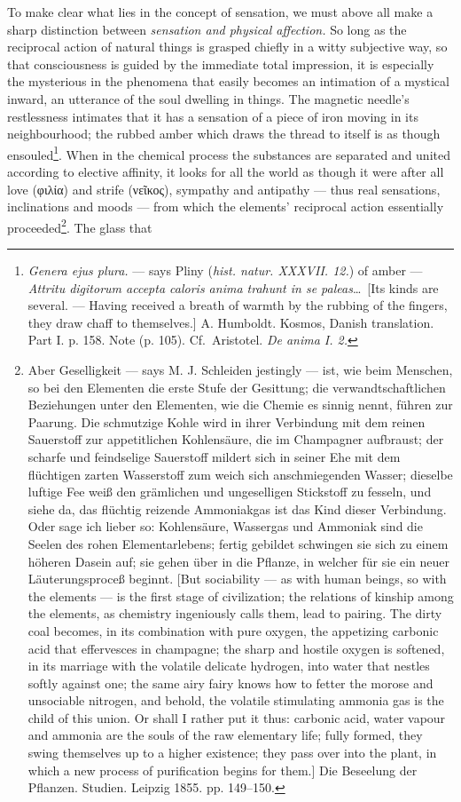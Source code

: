 \documentclass[12pt,a4paper]{book}
\begin{document}
To make clear what lies in the concept of sensation, we must above all make a sharp
distinction between \emph{sensation and physical affection.} So long as the
reciprocal action of natural things is grasped chiefly in a witty subjective way,
so that consciousness is guided by the immediate total impression, it is especially
the mysterious in the phenomena that easily becomes an intimation of a mystical
inward, an utterance of the soul dwelling in things. The magnetic needle's
restlessness intimates that it has a sensation of a piece of iron moving in its
neighbourhood; the rubbed amber which draws the thread to itself is as though
ensouled\footnote{\textit{Genera ejus plura.} --- says Pliny
(\textit{hist. natur. XXXVII. 12.}) of amber --- \textit{Attritu digitorum accepta
caloris anima trahunt in se paleas}\ldots\ [Its kinds are several. --- Having
received a breath of warmth by the rubbing of the fingers, they draw chaff to
themselves.] A. Humboldt. Kosmos, Danish translation. Part I. p. 158. Note
(p. 105). Cf.\ Aristotel. \textit{De anima I. 2.}}. When in the chemical process
the substances are separated and united according to elective affinity, it looks
for all the world as though it were after all love (φιλία) and strife (νεῖκος),
sympathy and antipathy --- thus real sensations, inclinations and moods --- from
which the elements' reciprocal action essentially proceeded\footnote{Aber
Geselligkeit --- says M. J. Schleiden jestingly --- ist, wie beim Menschen, so bei
den Elementen die erste Stufe der Gesittung; die verwandtschaftlichen Beziehungen
unter den Elementen, wie die Chemie es sinnig nennt, führen zur Paarung. Die
schmutzige Kohle wird in ihrer Verbindung mit dem reinen Sauerstoff zur
appetitlichen Kohlensäure, die im Champagner aufbraust; der scharfe und feindselige
Sauerstoff mildert sich in seiner Ehe mit dem flüchtigen zarten Wasserstoff zum
weich sich anschmiegenden Wasser; dieselbe luftige Fee weiß den grämlichen und
ungeselligen Stickstoff zu fesseln, und siehe da, das flüchtig reizende
Ammoniakgas ist das Kind dieser Verbindung. Oder sage ich lieber so: Kohlensäure,
Wassergas und Ammoniak sind die Seelen des rohen Elementarlebens; fertig gebildet
schwingen
sie sich zu einem höheren Dasein auf; sie gehen über in die Pflanze, in welcher für
sie ein neuer Läuterungsproceß beginnt. [But sociability --- as with human beings,
so with the elements --- is the first stage of civilization; the relations of
kinship among the elements, as chemistry ingeniously calls them, lead to pairing.
The dirty coal becomes, in its combination with pure oxygen, the appetizing carbonic
acid that effervesces in champagne; the sharp and hostile oxygen is softened, in its
marriage with the volatile delicate hydrogen, into water that nestles softly against
one; the same airy fairy knows how to fetter the morose and unsociable nitrogen, and
behold, the volatile stimulating ammonia gas is the child of this union. Or shall I
rather put it thus: carbonic acid, water vapour and ammonia are the souls of the raw
elementary life; fully formed, they swing themselves up to a higher existence; they
pass over into the plant, in which a new process of purification begins for them.]
Die Beseelung der Pflanzen. Studien. Leipzig 1855. pp. 149--150.}. The glass that
\end{document}
